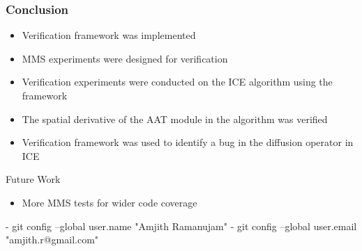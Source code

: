 \documentclass[10pt]{beamer}
\begin{document}
\begin{frame}
\frametitle{Conclusion}
\begin{itemize}
\item Verification framework was implemented
\item MMS experiments were designed for verification
\item Verification experiments were conducted on the ICE algorithm using the framework
\item The spatial derivative of the AAT module in the algorithm was verified
\item Verification framework was used to identify a bug in the diffusion operator in ICE
\end{itemize}
\begin{block}{Future Work}
\begin{itemize}
 \item More MMS tests for wider code coverage
\end{itemize}
		- git config --global user.name "Amjith Ramanujam"
		- git config --global user.email "amjith.r@gmail.com"
\end{block}


\end{frame}
\end{document}
